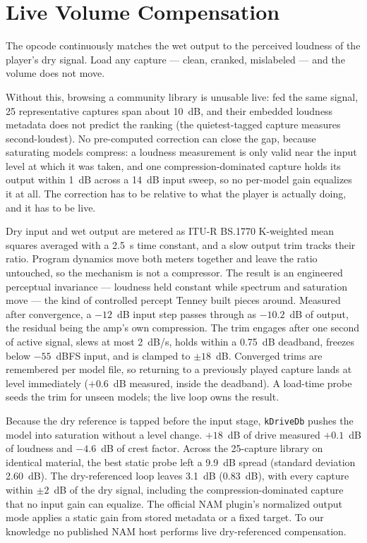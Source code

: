 \documentclass[sigconf,anonymous,review]{nimeart}
\begin{document}
\section{Live Volume Compensation}
\label{sec:volume}

The opcode continuously matches the wet output to the perceived loudness
of the player's dry signal. Load any capture --- clean, cranked,
mislabeled --- and the volume does not move.

Without this, browsing a community library is unusable live: fed the same
signal, 25 representative captures span about 10~dB, and their embedded
loudness metadata does not predict the ranking (the quietest-tagged
capture measures second-loudest). No pre-computed correction can close the
gap, because saturating models compress: a loudness measurement is only
valid near the input level at which it was taken, and one
compression-dominated capture holds its output within 1~dB across a 14~dB
input sweep, so no per-model gain equalizes it at all. The correction has
to be relative to what the player is actually doing, and it has to be
live.

Dry input and wet output are metered as ITU-R BS.1770 K-weighted mean
squares averaged with a 2.5~s time constant, and a slow output trim tracks
their ratio. Program dynamics move both meters together and leave the
ratio untouched, so the mechanism is not a compressor. The result is an
engineered perceptual invariance --- loudness held constant while spectrum
and saturation move --- the kind of controlled percept Tenney built pieces
around. Measured after
convergence, a $-12$~dB input step passes through as $-10.2$~dB of output,
the residual being the amp's own compression. The trim engages after one
second of active signal, slews at most 2~dB/s, holds within a 0.75~dB
deadband, freezes below $-55$~dBFS input, and is clamped to $\pm 18$~dB.
Converged trims are remembered per model file, so returning to a
previously played capture lands at level immediately ($+0.6$~dB measured,
inside the deadband). A load-time probe seeds the trim for unseen models;
the live loop owns the result.

Because the dry reference is tapped before the input stage,
\texttt{kDriveDb} pushes the model into saturation without a level change.
$+18$~dB of drive measured $+0.1$~dB of loudness and $-4.6$~dB of crest
factor. Across the 25-capture library on identical material, the best
static probe left a 9.9~dB spread (standard deviation 2.60~dB). The
dry-referenced loop leaves 3.1~dB (0.83~dB), with every capture within
$\pm 2$~dB of the dry signal, including the compression-dominated capture
that no input gain can equalize. The official NAM plugin's normalized
output mode applies a static gain from stored metadata or a fixed target.
To our knowledge no published NAM host performs live dry-referenced
compensation.
\end{document}
